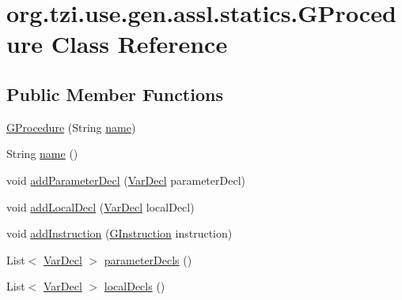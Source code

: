 \hypertarget{classorg_1_1tzi_1_1use_1_1gen_1_1assl_1_1statics_1_1_g_procedure}{\section{org.\-tzi.\-use.\-gen.\-assl.\-statics.\-G\-Procedure Class Reference}
\label{classorg_1_1tzi_1_1use_1_1gen_1_1assl_1_1statics_1_1_g_procedure}
}
\subsection*{Public Member Functions}
\begin{DoxyCompactItemize}
\item 
\hyperlink{classorg_1_1tzi_1_1use_1_1gen_1_1assl_1_1statics_1_1_g_procedure_a6c8e6981c5c5f732fe2926bd93873982}{G\-Procedure} (String \hyperlink{classorg_1_1tzi_1_1use_1_1gen_1_1assl_1_1statics_1_1_g_procedure_af105fccd04637cb60dd89bb0ea7ba2f5}{name})
\item 
String \hyperlink{classorg_1_1tzi_1_1use_1_1gen_1_1assl_1_1statics_1_1_g_procedure_af105fccd04637cb60dd89bb0ea7ba2f5}{name} ()
\item 
void \hyperlink{classorg_1_1tzi_1_1use_1_1gen_1_1assl_1_1statics_1_1_g_procedure_a855cc253bfbc1aab6769913e28944cd1}{add\-Parameter\-Decl} (\hyperlink{classorg_1_1tzi_1_1use_1_1uml_1_1ocl_1_1expr_1_1_var_decl}{Var\-Decl} parameter\-Decl)
\item 
void \hyperlink{classorg_1_1tzi_1_1use_1_1gen_1_1assl_1_1statics_1_1_g_procedure_ae5a3796beef4d20a55e2e7b27897a2ad}{add\-Local\-Decl} (\hyperlink{classorg_1_1tzi_1_1use_1_1uml_1_1ocl_1_1expr_1_1_var_decl}{Var\-Decl} local\-Decl)
\item 
void \hyperlink{classorg_1_1tzi_1_1use_1_1gen_1_1assl_1_1statics_1_1_g_procedure_a3cfbfa226b15f24f90fa674d781283d4}{add\-Instruction} (\hyperlink{interfaceorg_1_1tzi_1_1use_1_1gen_1_1assl_1_1statics_1_1_g_instruction}{G\-Instruction} instruction)
\item 
List$<$ \hyperlink{classorg_1_1tzi_1_1use_1_1uml_1_1ocl_1_1expr_1_1_var_decl}{Var\-Decl} $>$ \hyperlink{classorg_1_1tzi_1_1use_1_1gen_1_1assl_1_1statics_1_1_g_procedure_a025b0c410f588d360ed96145922ec1b8}{parameter\-Decls} ()
\item 
List$<$ \hyperlink{classorg_1_1tzi_1_1use_1_1uml_1_1ocl_1_1expr_1_1_var_decl}{Var\-Decl} $>$ \hyperlink{classorg_1_1tzi_1_1use_1_1gen_1_1assl_1_1statics_1_1_g_procedure_ad0b3975abfa86f1bf4b56a7e31a21253}{local\-Decls} ()

\end{DoxyCompactItemize}
